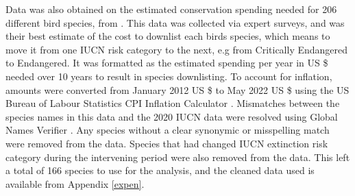 \documentclass[12pt]{article}
\begin{document}
	Data was also obtained on the estimated conservation spending needed for 206 different bird species, from \citet{mccarthyFinancialCostsMeeting2012}. This data was collected via expert surveys, and was their best estimate of the cost to downlist each birds species,
	which means to move it from one IUCN risk category to the next, e.g from Critically Endangered
	to Endangered. It was formatted as the estimated spending per year in US \$ needed over 10 years to result in species downlisting. To account for inflation, amounts were converted from January 2012
	US \$ to May 2022 US \$ using the US Bureau of Labour Statistics CPI Inflation Calculator
	\citep{CPIInflationCalculator} %
	. Mismatches between the species names in this data and the 2020 IUCN data were resolved using Global Names Verifier \citep{mozzherinGnamesGnverifierV12022}. Any species without a clear synonymic or misspelling match were removed from the data. Species that had changed IUCN extinction risk category
	during the intervening period were also removed from the data. This left a total of 166 species to use for the analysis, and the cleaned data used is available from Appendix \ref{expen}.
	
\end{document}
